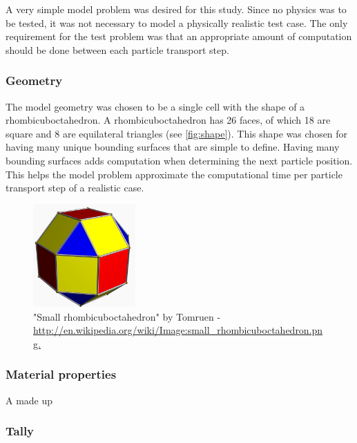 \documentclass{mc2015}
\begin{document}
A very simple model problem was desired for this study.
Since no physics was to be tested, it was not necessary to model a
physically realistic test case.
The only requirement for the test problem was that an appropriate amount
of computation should be done between each particle transport step.

\subsubsection{Geometry}

The model geometry was chosen to be a single cell with the shape of a rhombicuboctahedron.
A rhombicuboctahedron has 26 faces, of which 18 are square and 8 are equilateral triangles
(see \autoref{fig:shape}).
This shape was chosen for having many unique bounding surfaces that are simple to define.
Having many bounding surfaces adds computation when determining the next particle position.
This helps the model problem approximate the computational time
per particle transport step of a realistic case.

\begin{figure}
	\centering
		\includegraphics[width=0.35\textwidth]{Small_rhombicuboctahedron.png}
		\caption{\small "Small rhombicuboctahedron" by Tomruen -
			\url{http://en.wikipedia.org/wiki/Image:small_rhombicuboctahedron.png.}}
		\label{fig:shape}
\end{figure}

\subsubsection{Material properties}

A made up 

\subsubsection{Tally}



\end{document}

